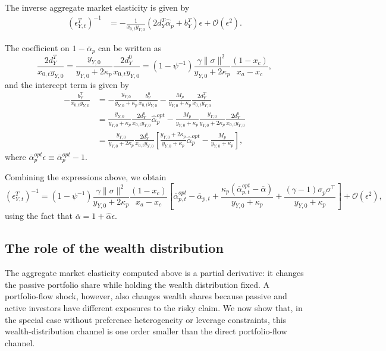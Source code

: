 The inverse aggregate market elasticity is given by
\begin{align}
    (\epsilon_{Y,t}^T)^{-1} 
    &= -\frac{1}{x_{0,t} y_{Y,0}} \left(2 d_Y^T \hat{\alpha}_p + b_Y^T \right) \epsilon + \mathcal{O}(\epsilon^2).
\end{align}

The coefficient on $1-\overline{\alpha}_p$ can be written as
\begin{equation}
    \frac{2 d_Y^T}{x_{0,t} y_{Y,0}} = \frac{y_{Y,0}}{y_{Y,0}+2\kappa_p} \frac{2 d_Y^0}{x_{0,t} y_{Y,0}} = (1-\psi^{-1}) \frac{\gamma\|\sigma\|^2}{y_{Y,0}+2\kappa_p} \frac{(1-x_c)}{x_a-x_c} ,
\end{equation}
and the intercept term is given by
\begin{align}
    -\frac{b_Y^T}{x_{0,t} y_{Y,0}} &= - \frac{y_{Y,0}}{y_{Y,0}+\kappa_p} \frac{b_Y^0}{x_{0,t} y_{Y,0}} - \frac{M_p}{y_{Y,0}+\kappa_p} \frac{2 d_Y^T}{x_{0,t} y_{Y,0}}\\
    &= \frac{y_{Y,0}}{y_{Y,0}+\kappa_p} \frac{2 d_Y^0}{x_{0,t} y_{Y,0}} \hat{\alpha}_p^{opt} - \frac{M_p}{y_{Y,0}+\kappa_p} \frac{y_{Y,0}}{y_{Y,0}+2\kappa_p} \frac{2 d_Y^0}{x_{0,t} y_{Y,0}}\\
    &= \frac{y_{Y,0}}{y_{Y,0}+2\kappa_p} \frac{2 d_Y^0}{x_{0,t} y_{Y,0}} \left[ \frac{y_{Y,0}+2 \kappa_p}{y_{Y,0}+\kappa_p} \hat{\alpha}_p^{opt} -\frac{M_p}{y_{Y,0}+\kappa_p} \right],
\end{align}
where $\overline{\alpha}_p^{opt} \epsilon \equiv \overline{\alpha}_p^{opt}-1$.

Combining the expressions above, we obtain
\begin{equation}
    (\epsilon_{Y,t}^T)^{-1} 
    =(1-\psi^{-1}) \frac{\gamma\|\sigma\|^2}{y_{Y,0}+2\kappa_p} \frac{(1-x_c)}{x_a-x_c} \left[ \overline{\alpha}_{p,t}^{opt}- \overline{\alpha}_{p,t}+\frac{\kappa_p(\overline{\alpha}_{p,t}^{opt}-\overline{\alpha})}{y_{Y,0}+\kappa_p}  +\frac{(\gamma-1) \sigma_p \sigma^\top}{y_{Y,0}+\kappa_p} \right] + \mathcal{O}(\epsilon^2),
\end{equation}
using the fact that $\overline{\alpha} = 1 + \hat{\alpha}\epsilon$.

\subsection{The role of the wealth distribution}

The aggregate market elasticity computed above is a partial derivative: it changes the passive portfolio share while holding the wealth distribution fixed.
A portfolio-flow shock, however, also changes wealth shares because passive and active investors have different exposures to the risky claim.
We now show that, in the special case without preference heterogeneity or leverage constraints, this wealth-distribution channel is one order smaller than the direct portfolio-flow channel.

